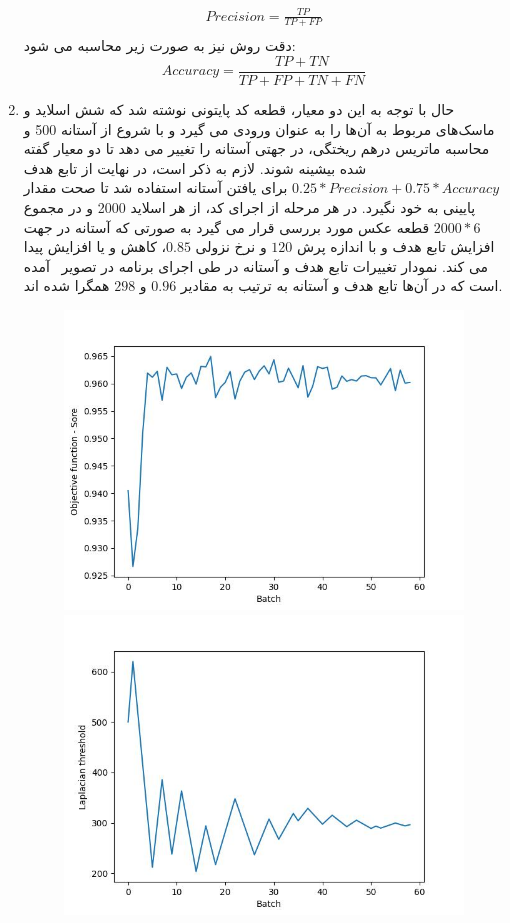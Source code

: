 \begin{enumerate}
\begin{gather*}
        Precision = \frac{TP}{TP + FP}\\
    \end{gather*}
    دقت روش نیز به صورت زیر محاسبه می شود:
    \[Accuracy = \frac{TP + TN}{TP + FP + TN + FN}\]
    \item حال با توجه به این دو معیار، قطعه کد پایتونی نوشته شد که شش اسلاید و ماسک‌های مربوط به آن‌ها را به عنوان ورودی می گیرد و با شروع از آستانه 500 و محاسبه ماتریس درهم ریختگی، در جهتی آستانه را تغییر می دهد تا دو معیار گفته شده بیشینه شوند.
    لازم به ذکر است، در نهایت از تابع هدف $0.25*Precision+0.75*Accuracy$ برای یافتن آستانه استفاده شد تا صحت مقدار پایینی به خود نگیرد.
    در هر مرحله از اجرای کد، از هر اسلاید 2000 و در مجموع $2000 * 6$ قطعه عکس مورد بررسی قرار می گیرد به صورتی که آستانه در جهت افزایش تابع هدف و با اندازه پرش $120$ و نرخ نزولی $0.85$، کاهش و یا افزایش پیدا می کند.
    نمودار تغییرات تابع هدف و آستانه در طی اجرای برنامه در تصویر~ آمده است که در آن‌ها تابع هدف و آستانه به ترتیب به مقادیر $0.96$ و $298$ همگرا شده اند.
    \begin{figure}
        \begin{center}
            \includegraphics[width=0.48\linewidth]{figs/introduction/subs/challenges/laplacian_threshold_score_history_chart.jpeg}
            \includegraphics[width=0.48\linewidth]{figs/introduction/subs/challenges/laplacian_threshold_history_chart.jpeg}
        \end{center}

\end{figure}
\end{enumerate}
